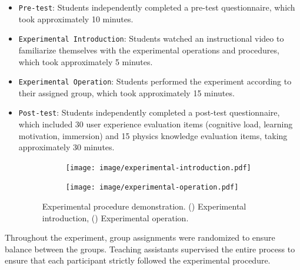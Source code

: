 \documentclass[sigconf,review,anonymous]{acmart}
\begin{document}
\begin{itemize}
\item {\texttt{Pre-test}}: Students independently completed a pre-test questionnaire, which took approximately 10 minutes.

\item {\texttt{Experimental Introduction}}: Students watched an instructional video to familiarize themselves with the experimental operations and procedures, which took approximately 5 minutes.

\item {\texttt{Experimental Operation}}: Students performed the experiment according to their assigned group, which took approximately 15 minutes.

\item {\texttt{Post-test}}: Students independently completed a post-test questionnaire, which included 30 user experience evaluation items (cognitive load, learning motivation, immersion) and 15 physics knowledge evaluation items, taking approximately 30 minutes.

\begin{figure}[h]
  \begin{subfigure}{0.48\linewidth} %
    \centering
    \texttt{[image: image/experimental-introduction.pdf]}
    \caption{} %
    \label{fig:experimental-introduction}
  \end{subfigure}
  \hfill %
  \begin{subfigure}{0.48\linewidth} %
    \centering
    \texttt{[image: image/experimental-operation.pdf]}
    \caption{} %
    \label{fig:experimental-operation}
  \end{subfigure}
  \caption{Experimental procedure demonstration. () Experimental introduction, () Experimental operation.}
  \label{fig:experimental-procedure}
\end{figure}

\end{itemize}

Throughout the experiment, group assignments were randomized to ensure balance between the groups. Teaching assistants supervised the entire process to ensure that each participant strictly followed the experimental procedure.
\end{document}
